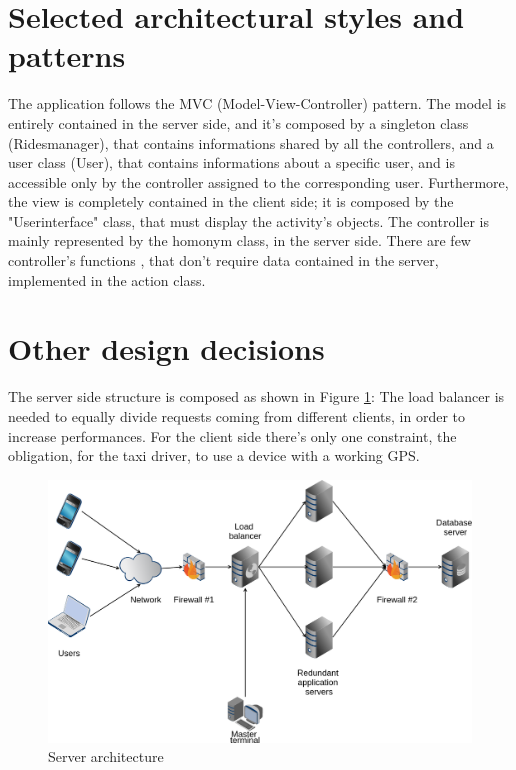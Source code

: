 \section{Selected architectural styles and patterns}
The application follows the MVC (Model-View-Controller) pattern.
The model is entirely contained in the server side, and it's composed by a singleton class (Ridesmanager), that contains 
informations shared by all the controllers, and a user class (User), that contains informations about a specific user, and is
accessible only by the controller assigned to the corresponding user.
Furthermore, the view is completely contained in the client side; it is composed by the "Userinterface" class, that must display
the activity's objects.
The controller is mainly represented by the homonym class, in the server side. There are few controller's functions , that don't 
require data contained in the server, implemented in the action class.

\section{Other design decisions}
The server side structure is composed as shown in Figure \ref{fig:hwarch}:
The load balancer is needed to equally divide requests coming from different clients, in order to increase performances.
For the client side there's only one constraint, the obligation, for the taxi driver, to use a device with a working GPS.

\begin{figure} [h]
  \centering
  \includegraphics[scale=0.35]{../../architecture/architecture.png}
\caption{Server architecture \label{fig:hwarch}}
\end{figure}
